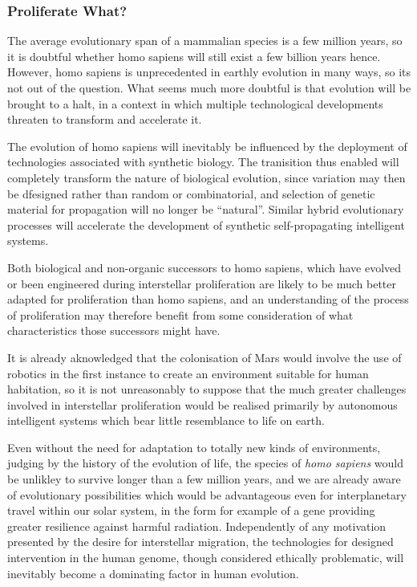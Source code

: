 \documentclass[10pt,titlepage]{article}
\begin{document}
\cite{sandberg-sme}

\subsubsection{Proliferate What?}

The average evolutionary span of a mammalian species is a few million years, so it is doubtful  whether homo sapiens will still exist a few billion years hence.
However, homo sapiens is unprecedented in earthly evolution in many ways, so its not out of the question.
What seems much more doubtful is that evolution will be brought to a halt, in a context in which multiple technological developments threaten to transform and accelerate it.

The evolution of homo sapiens will inevitably be influenced by the deployment of technologies associated with synthetic biology.
The tranisition thus enabled will completely transform the nature of biological evolution, since variation may then be dfesigned rather than random or combinatorial, and selection of genetic material for propagation will no longer be ``natural''.
Similar hybrid evolutionary processes will accelerate the development of synthetic self-propagating intelligent systems. 

Both biological and non-organic successors to homo sapiens, which have evolved or been engineered during interstellar proliferation are likely to be much better adapted for proliferation than homo sapiens, and an understanding of the process of proliferation may therefore benefit from some consideration of what characteristics those successors might have.

It is already aknowledged that the colonisation of Mars would involve the use of robotics in the first instance to create an environment suitable for human habitation, so it is not unreasonably to suppose that the much greater challenges involved in interstellar proliferation would be realised primarily by autonomous intelligent systems which bear little resemblance to life on earth.

Even without the need for adaptation to totally new kinds of environments, judging by the history of the evolution of life, the species of \emph{homo sapiens} would be unlikley to survive longer than a few million years, and we are already aware of evolutionary possibilities which would be advantageous even for interplanetary travel within our solar system, in the form for example of a gene providing greater resilience against harmful radiation.
Independently of any motivation presented by the desire for interstellar migration, the technologies for designed intervention in the human genome, though considered ethically problematic, will inevitably become a dominating factor in human evolution.
\end{document}
